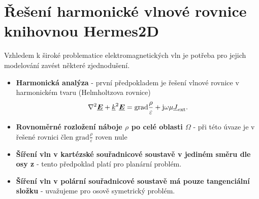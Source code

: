 \section{Řešení harmonické vlnové rovnice knihovnou Hermes2D} \label{sec:sim_hermes2d}
Vzhledem k široké problematice elektromagnetických vln je potřeba pro jejich modelování zavést některé zjednodušení. 
\begin{itemize}
\item {\bf Harmonická analýza} - první předpokladem je řešení vlnové rovnice v harmonickém tvaru (Helmholtzova rovnice)
\begin{equation}
	\nabla^{2}\mbox{\underline{\boldmath$E$}} +{\underline{k}}^{2}\mbox{\underline{\boldmath$E$}} = \mathrm{grad}\frac{\rho}{\varepsilon} + \mathrm{j}\omega\mu{\underline{J}}_{\mathrm{ext}}.
    \label{rce:sim_helmholtz_vychozi} 
\end{equation}
\item {\bf Rovnoměrné rozložení náboje $\rho$ po celé oblasti $\Omega$} - při této úvaze je v řešené rovnici člen $\mathrm{grad}\frac{\rho}{\varepsilon}$ roven nule
\item {\bf Šíření vln v kartézské souřadnicové soustavě v jediném směru dle osy z} - tento předpoklad platí pro planární problém.
\item {\bf Šíření vln v polární souřadnicové soustavě má pouze tangenciální složku} - uvažujeme pro osově symetrický problém.
\end{itemize}


